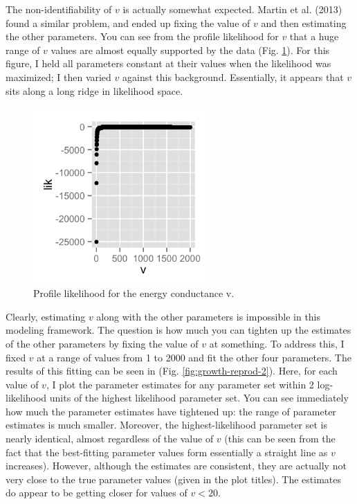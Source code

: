 \documentclass[12pt,reqno,final,pdftex]{amsart}\usepackage[]{graphicx}\usepackage[]{color}
\newenvironment{knitrout}{}{} %
\theoremstyle{plain}
\numberwithin{equation}{part}
\begin{document}
The non-identifiability of $v$ is actually somewhat expected.
Martin et al. (2013) found a similar problem, and ended up fixing the value of $v$ and then estimating the other parameters.
You can see from the profile likelihood for $v$ that a huge range of $v$ values are almost equally supported by the data (Fig. \ref{fig:profile-v}).
For this figure, I held all parameters constant at their values when the likelihood was maximized; I then varied $v$ against this background.
Essentially, it appears that $v$ sits along a long ridge in likelihood space.
\begin{knitrout}\scriptsize
{}\color{fgcolor}\begin{figure}

\includegraphics[width=0.6\textwidth]{figure/profile-v-1} \hfill{}

\caption[Profile likelihood for the energy conductance v]{Profile likelihood for the energy conductance v.}\label{fig:profile-v}
\end{figure}


\end{knitrout}

Clearly, estimating $v$ along with the other parameters is impossible in this modeling framework.
The question is how much you can tighten up the estimates of the other parameters by fixing the value of $v$ at something.
To address this, I fixed $v$ at a range of values from 1 to 2000 and fit the other four parameters.
The results of this fitting can be seen in (Fig. \ref{fig:growth-reprod-2}).
Here, for each value of $v$, I plot the parameter estimates for any parameter set within 2 log-likelihood units of the highest likelihood parameter set.
You can see immediately how much the parameter estimates have tightened up: the range of parameter estimates is much smaller.
Moreover, the highest-likelihood parameter set is nearly identical, almost regardless of the value of $v$ (this can be seen from the fact that the best-fitting parameter values form essentially a straight line as $v$ increases).
However, although the estimates are consistent, they are actually not very close to the true parameter values (given in the plot titles).
The estimates do appear to be getting closer for values of $v < 20$.
\end{document}
